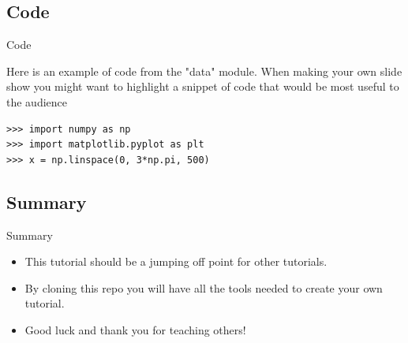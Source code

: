 \documentclass{beamer}
\begin{document}
\subsection{Code}

\begin{frame}[fragile]{Code}

Here is an example of code from the "data" module. When making your own slide show you might want to highlight a snippet of code that would be most useful to the audience 

\begin{verbatim}
>>> import numpy as np
>>> import matplotlib.pyplot as plt
>>> x = np.linspace(0, 3*np.pi, 500)
\end{verbatim}

\end{frame}

\subsection{Summary}

\begin{frame}{Summary}

\begin{itemize}[<+->]
\item This tutorial should be a jumping off point for other tutorials. 
\item By cloning this repo you will have all the tools needed to create your own tutorial.
\item Good luck and thank you for teaching others!
\end{itemize}

\end{frame}
\end{document}
